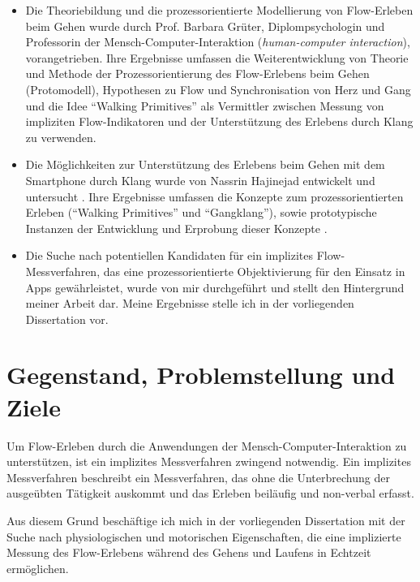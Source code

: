 \begin{itemize}

	\item Die Theoriebildung und die prozessorientierte Modellierung von Flow-Erleben beim Gehen wurde durch Prof. Barbara Grüter, Diplompsychologin und Professorin der Mensch-Computer-Interaktion (\emph{human-computer interaction}), vorangetrieben. Ihre Ergebnisse umfassen die Weiterentwicklung von Theorie und Methode der Prozessorientierung des Flow-Erlebens beim Gehen (Protomodell), Hypothesen zu Flow und Synchronisation von Herz und Gang und die Idee "`Walking Primitives"' als Vermittler zwischen Messung von impliziten Flow-Indikatoren und der Unterstützung des Erlebens durch Klang zu verwenden.

	\item Die Möglichkeiten zur Unterstützung des Erlebens beim Gehen mit dem Smartphone durch Klang wurde von Nassrin Hajinejad entwickelt und untersucht \citep{Hajinejad2013}. Ihre Ergebnisse umfassen die Konzepte zum prozessorientierten Erleben ("`Walking Primitives"' und "`Gangklang"'), sowie prototypische Instanzen der Entwicklung und Erprobung dieser Konzepte \citep{Hajinejad2015}.

	\item Die Suche nach potentiellen Kandidaten für ein implizites Flow-Messverfahren, das eine prozessorientierte Objektivierung für den Einsatz in Apps gewährleistet, wurde von mir durchgeführt und stellt den Hintergrund meiner Arbeit dar. Meine Ergebnisse stelle ich in der vorliegenden Dissertation vor.

\end{itemize}


\section{Gegenstand, Problemstellung und Ziele}

Um Flow-Erleben durch die Anwendungen der Mensch-Computer-Interaktion zu unterstützen, ist ein implizites Messverfahren zwingend notwendig. Ein implizites Messverfahren beschreibt ein Messverfahren, das ohne die Unterbrechung der ausgeübten Tätigkeit auskommt und das Erleben beiläufig und non-verbal erfasst.

Aus diesem Grund beschäftige ich mich in der vorliegenden Dissertation mit der Suche nach physiologischen und motorischen Eigenschaften, die eine implizierte Messung des Flow-Erlebens während des Gehens und Laufens in Echtzeit ermöglichen. 

